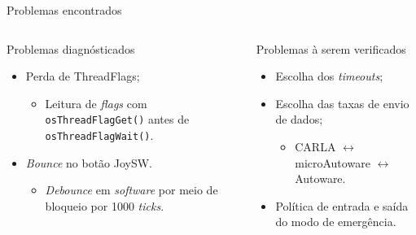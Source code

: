 \documentclass{if-beamer}
\begin{document}
\begin{frame}{Problemas encontrados}
	
	\begin{columns}
		
		\begin{column}{0.5\textwidth}
			
			\begin{block}{Problemas diagnósticados}
				
				\begin{itemize}
					\item Perda de ThreadFlags;
					\begin{itemize}
						\item Leitura de \textit{flags} com \texttt{osThreadFlagGet()} antes de \texttt{osThreadFlagWait()}.
						
					\end{itemize}
					\item \textit{Bounce} no botão JoySW.
					\begin{itemize}
						\item \textit{Debounce} em \textit{software} por meio de bloqueio por 1000 \textit{ticks}.
						
					\end{itemize}
					
				\end{itemize}
				
			\end{block}
			
		\end{column}
		
		\begin{column}{0.5\textwidth}
			
			\begin{block}{Problemas à serem verificados}
				
				\begin{itemize}
					\item Escolha dos \textit{timeouts};
					\item Escolha das taxas de envio de dados;
					\begin{itemize}
						\item CARLA $\leftrightarrow$ microAutoware $\leftrightarrow$ Autoware.
						
					\end{itemize}
					\item Política de entrada e saída do modo de emergência.
				\end{itemize}
				
			\end{block}
			
		\end{column}
		
	\end{columns}
	
\end{frame}
\end{document}
